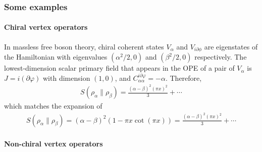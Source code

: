 \documentclass[11pt]{article}
\newcommand{\p}{\partial}
\begin{document}
\subsubsection{Some examples}
  \paragraph{Chiral vertex operators}

  In massless free boson theory, chiral coherent states $V_\alpha$ and $V_{i\partial\phi}$ are eigenstates of the Hamiltonian with eigenvalues $(\alpha^2/2,0)$ and $(\beta^2/2,0)$ respectively. The lowest-dimension scalar primary field that appears in the OPE of a pair of $V_\alpha$ is $J=i(\p\varphi)$ with dimension $(1,0)$, and $C^{i\p\varphi}_{\alpha\alpha}=-\alpha$. Therefore,
  \begin{align}
    S(\rho_\alpha\|\rho_\beta)=\frac{(\alpha-\beta)^2(\pi x)^2}{3}+\cdots
  \end{align}
  which matches the expansion of 
  \begin{align}
    S(\rho_\alpha\|\rho_\beta)=(\alpha-\beta)^2(1-\pi x\cot(\pi x))=\frac{(\alpha-\beta)^2(\pi x)^2}{3}+\cdots
  \end{align}

  \paragraph{Non-chiral vertex operators}
\end{document}
